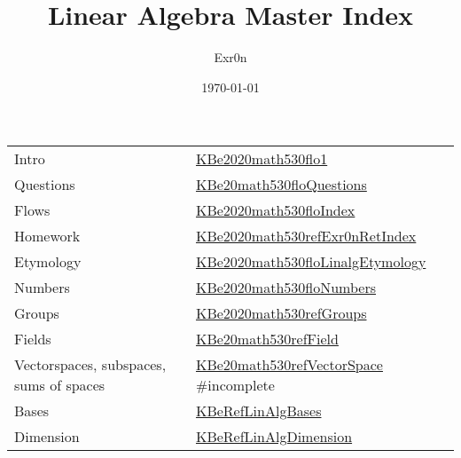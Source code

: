 \documentclass[letterpaper]{article}
\author{Exr0n}
\date{\today}
\title{Linear Algebra Master Index}
\renewcommand\maketitle{}
\begin{document}
\maketitle
\begin{center}
\begin{tabular}{ll}
Intro & \href{KBe2020math530flo1.org}{KBe2020math530flo1}\\
Questions & \href{KBe20math530floQuestions.org}{KBe20math530floQuestions}\\
Flows & \href{KBe2020math530floIndex.org}{KBe2020math530floIndex}\\
Homework & \href{KBe2020math530refExr0nRetIndex.org}{KBe2020math530refExr0nRetIndex}\\
Etymology & \href{KBe2020math530floLinalgEtymology.org}{KBe2020math530floLinalgEtymology}\\
Numbers & \href{KBe2020math530floNumbers.org}{KBe2020math530floNumbers}\\
Groups & \href{KBe2020math530refGroups.org}{KBe2020math530refGroups}\\
Fields & \href{KBe20math530refField.org}{KBe20math530refField}\\
Vectorspaces, subspaces, sums of spaces & \href{KBe20math530refVectorSpace.org}{KBe20math530refVectorSpace} \#incomplete\\
Bases & \href{KBeRefLinAlgBases.org}{KBeRefLinAlgBases}\\
Dimension & \href{KBeRefLinAlgDimension.org}{KBeRefLinAlgDimension}\\
\end{tabular}
\end{center}
\end{document}
